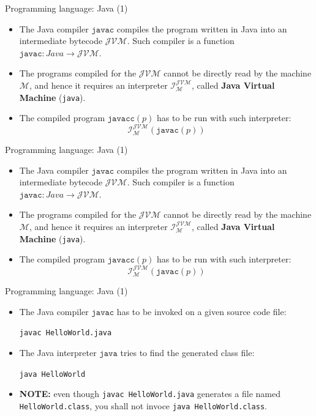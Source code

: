 \documentclass{beamer}
\begin{document}
\begin{frame}{Programming language: Java (1)}
	\begin{itemize}
		\item The Java compiler $\texttt{javac}$ compiles the program written in Java into an intermediate bytecode $\mathcal{JVM}$. Such compiler is a function $\texttt{javac}\colon Java\to \mathcal{JVM}$.
		\item The programs compiled for the $\mathcal{JVM}$ cannot be directly read by the machine $\mathcal{M}$, and hence it requires an interpreter $\mathcal{I}_{\mathcal{M}}^{\mathcal{JVM}}$, called \textbf{Java Virtual Machine} (\texttt{java}).
		\item The compiled program $\texttt{javacc}(p)$ has to be run with such interpreter:
		\[\mathcal{I}_{\mathcal{M}}^{\mathcal{JVM}}(\texttt{javac}(p))\]
	\end{itemize}
\end{frame}

\begin{frame}{Programming language: Java (1)}
	\begin{itemize}
		\item The Java compiler $\texttt{javac}$ compiles the program written in Java into an intermediate bytecode $\mathcal{JVM}$. Such compiler is a function $\texttt{javac}\colon Java\to \mathcal{JVM}$.
		\item The programs compiled for the $\mathcal{JVM}$ cannot be directly read by the machine $\mathcal{M}$, and hence it requires an interpreter $\mathcal{I}_{\mathcal{M}}^{\mathcal{JVM}}$, called \textbf{Java Virtual Machine} (\texttt{java}).
		\item The compiled program $\texttt{javacc}(p)$ has to be run with such interpreter:
		\[\mathcal{I}_{\mathcal{M}}^{\mathcal{JVM}}(\texttt{javac}(p))\]
	\end{itemize}
\end{frame}

\begin{frame}{Programming language: Java (1)}
	\begin{itemize}
		\item The Java compiler $\texttt{javac}$ has to be invoked on a given source code file:
		\begin{center}
			\texttt{javac HelloWorld.java}
		\end{center}
		\item The Java interpreter $\texttt{java}$ tries to find the generated class file:
		\begin{center}
			\texttt{java HelloWorld}
		\end{center}
		\item \textbf{NOTE:} even though \texttt{javac HelloWorld.java} generates a file named \texttt{HelloWorld.class}, you shall not invoce \texttt{java HelloWorld.class}.
	\end{itemize}
\end{frame}
\end{document}
